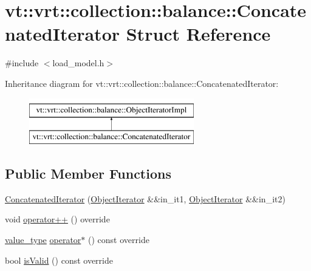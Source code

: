 \hypertarget{structvt_1_1vrt_1_1collection_1_1balance_1_1_concatenated_iterator}{}\section{vt\+:\+:vrt\+:\+:collection\+:\+:balance\+:\+:Concatenated\+Iterator Struct Reference}
\label{structvt_1_1vrt_1_1collection_1_1balance_1_1_concatenated_iterator}


{\ttfamily \#include $<$load\+\_\+model.\+h$>$}

Inheritance diagram for vt\+:\+:vrt\+:\+:collection\+:\+:balance\+:\+:Concatenated\+Iterator\+:\begin{figure}[H]
\begin{center}
\leavevmode
\includegraphics[height=2.000000cm]{structvt_1_1vrt_1_1collection_1_1balance_1_1_concatenated_iterator}
\end{center}
\end{figure}
\subsection*{Public Member Functions}
\begin{DoxyCompactItemize}
\item 
\hyperlink{structvt_1_1vrt_1_1collection_1_1balance_1_1_concatenated_iterator_a69257d76a55b73fc572196e01665d6d5}{Concatenated\+Iterator} (\hyperlink{structvt_1_1vrt_1_1collection_1_1balance_1_1_object_iterator}{Object\+Iterator} \&\&in\+\_\+it1, \hyperlink{structvt_1_1vrt_1_1collection_1_1balance_1_1_object_iterator}{Object\+Iterator} \&\&in\+\_\+it2)
\item 
void \hyperlink{structvt_1_1vrt_1_1collection_1_1balance_1_1_concatenated_iterator_aa89d0b18e2595bda59867f3254658125}{operator++} () override
\item 
\hyperlink{structvt_1_1vrt_1_1collection_1_1balance_1_1_object_iterator_impl_a8a38ab2c722e341d729f61cb59112376}{value\+\_\+type} \hyperlink{structvt_1_1vrt_1_1collection_1_1balance_1_1_concatenated_iterator_abbd9041193bd96a5d56c65ba8f2276fe}{operator$\ast$} () const override
\item 
bool \hyperlink{structvt_1_1vrt_1_1collection_1_1balance_1_1_concatenated_iterator_ad19f57e2365b42bf0739afc2616602c2}{is\+Valid} () const override
\end{DoxyCompactItemize}
